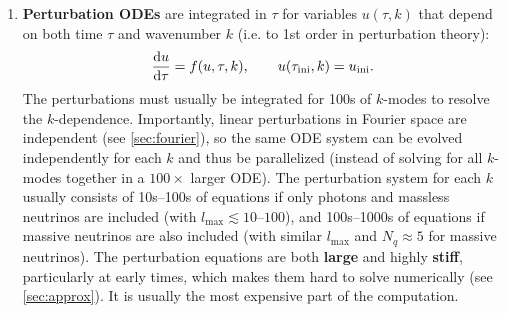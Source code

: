 \documentclass[USenglish, thumbmarks]{uiophdthesis} %
\newcommand\ini{\mathrm{ini}}
\newcommand\lmax{{\ensuremath{l_\mathrm{max}}}}
\begin{document}
\begin{enumerate}
\item \textbf{Perturbation ODEs} are integrated in $\tau$ for variables $u(\tau, k)$ that depend on both time $\tau$ and wavenumber $k$
(i.e. to 1st order in perturbation theory):
\begin{equation}
\odv{u}{\tau} = f(u, \tau, k),
\qquad
u(\tau_\ini, k) = u_\ini.
\label{eq:pt_ode}
\end{equation}
The perturbations must usually be integrated for 100s of $k$-modes to resolve the $k$-dependence.
Importantly, linear perturbations in Fourier space are independent (see \cref{sec:fourier}),
so the same ODE system can be evolved independently for each $k$ and thus be parallelized (instead of solving for all $k$-modes together in a $100\times$ larger ODE).
The perturbation system for each $k$ usually consists of 10s--100s of equations if only photons and massless neutrinos are included (with $\lmax \lesssim 10\text{--}100$),
and 100s--1000s of equations if massive neutrinos are also included (with similar $\lmax$ and $N_q \approx 5$ for massive neutrinos).
The perturbation equations are both \textbf{large} and highly \textbf{stiff},
particularly at early times,
which makes them hard to solve numerically (see \cref{sec:approx}).
It is usually the most expensive part of the computation.
\label{eb:pt}


\end{enumerate}
\end{document}
